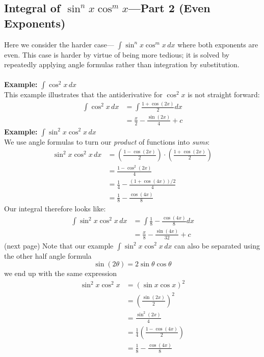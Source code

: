 \documentclass{report}
\begin{document}
\subsection{Integral of $\sin^nx\cos^mx$---Part 2 (Even Exponents)} %
Here we consider the harder case---
$\int\sin^nx\cos^mx\,dx$ where both exponents are even.
This case is harder by virtue of being more tedious; it is solved by repeatedly applying
angle formulas rather than integration by substitution.\\
\vspace{1mm}\\
\textbf{Example:} $\int\cos^2x\,dx$\\
This example illustrates that the antiderivative for $\cos^2x$ is not straight forward:
\begin{align*}
\int\cos^2x\,dx&=\int\frac{1+\cos(2x)}{2}dx\\
&=\frac{x}{2}-\frac{\sin(2x)}{4}+c
\end{align*}
\textbf{Example:} $\int\sin^2x\cos^2x\,dx$\\
We use angle formulas to turn our \textit{product} of functions into \textit{sums}:
\begin{align*}
\sin^2x\cos^2x\,dx&=\left(\frac{1-\cos(2x)}{2}\right)
\cdot\left(\frac{1+\cos(2x)}{2}\right)\\
&=\frac{1-\cos^2(2x)}{4}\\
&=\frac{1}{4}-\frac{(1+\cos(4x))/2}{4}\\
&=\frac{1}{8}-\frac{\cos(4x)}{8}
\end{align*}
Our integral therefore looks like:
\begin{align*}
\int\sin^2x\cos^2x\,dx&=\int\frac{1}{8}-\frac{\cos(4x)}{8}dx\\
&=\frac{x}{8}-\frac{\sin(4x)}{32}+c
\end{align*}
(next page)
\newpage
\noindent Note that our example $\int\sin^2x\cos^2x\,dx$
can also be separated using
the other half angle formula
\begin{equation*}
\sin(2\theta)=2\sin\theta\cos\theta
\end{equation*}
we end up with the same expression 
\begin{align*} 
\sin^2x\cos^2x&=(\sin x\cos x)^2\\
&=\left(\frac{\sin(2x)}{2}\right)^2\\
&=\frac{\sin^2(2x)}{4}\\
&=\frac{1}{4}\left(\frac{1-\cos(4x)}{2}\right)\\
&=\frac{1}{8}-\frac{\cos(4x)}{8}
\end{align*}
\newpage
\end{document}
